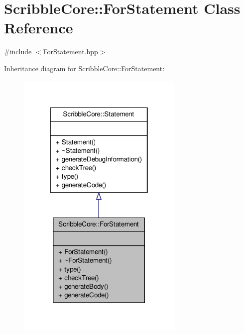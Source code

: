 \hypertarget{class_scribble_core_1_1_for_statement}{\section{Scribble\-Core\-:\-:For\-Statement Class Reference}
\label{class_scribble_core_1_1_for_statement}
}


{\ttfamily \#include $<$For\-Statement.\-hpp$>$}



Inheritance diagram for Scribble\-Core\-:\-:For\-Statement\-:
\nopagebreak
\begin{figure}[H]
\begin{center}
\leavevmode
\includegraphics[width=226pt]{class_scribble_core_1_1_for_statement__inherit__graph}
\end{center}
\end{figure}


